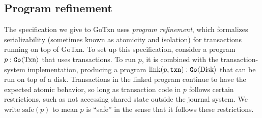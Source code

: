 \subsection{Program refinement}
\label{sec:txn:program-refinement}

The specification we give to GoTxn uses \emph{program refinement},
which formalizes serializability (sometimes known as atomicity and isolation)
for transactions running on top of GoTxn.
To set up this specification, consider a program $p : \mathtt{Go}\langle \mathrm{Txn} \rangle$ that
uses transactions.
To run $p$, it is combined with the transaction-system implementation, producing
a program $\mathrm{link}(p, \texttt{txn}) : \mathtt{Go}\langle \mathrm{Disk} \rangle$ that can be run on
top of a disk.
Transactions in the linked program continue to have the expected atomic
behavior, so long as transaction code in $p$ follows certain restrictions, such
as not accessing shared state outside the journal system.  We write
$\mathrm{safe}(p)$ to mean $p$ is ``safe'' in the sense that it follows these restrictions.

%

